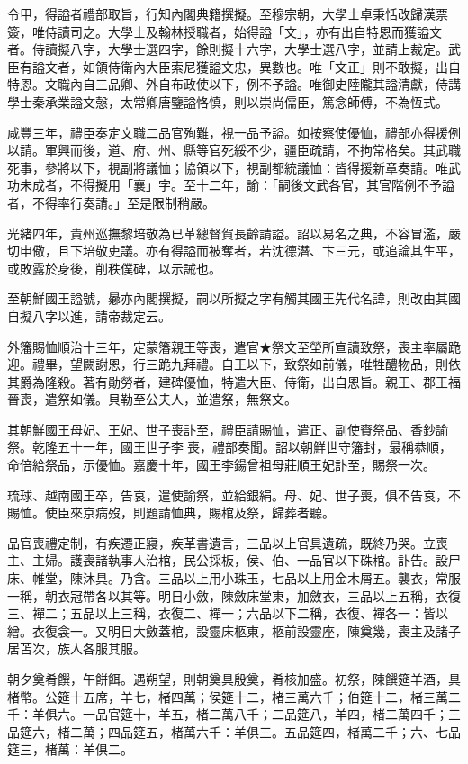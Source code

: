 \begin{pinyinscope}
令甲，得謚者禮部取旨，行知內閣典籍撰擬。至穆宗朝，大學士卓秉恬改歸漢票簽，唯侍讀司之。大學士及翰林授職者，始得謚「文」，亦有出自特恩而獲謚文者。侍讀擬八字，大學士選四字，餘則擬十六字，大學士選八字，並請上裁定。武臣有謚文者，如領侍衛內大臣索尼獲謚文忠，異數也。唯「文正」則不敢擬，出自特恩。文職內自三品卿、外自布政使以下，例不予謚。唯御史陸隴其謚清獻，侍講學士秦承業謚文愨，太常卿唐鑒謚恪慎，則以崇尚儒臣，篤念師傅，不為恆式。

咸豐三年，禮臣奏定文職二品官殉難，視一品予謚。如按察使優恤，禮部亦得援例以請。軍興而後，道、府、州、縣等官死綏不少，疆臣疏請，不拘常格矣。其武職死事，參將以下，視副將議恤；協領以下，視副都統議恤：皆得援新章奏請。唯武功未成者，不得擬用「襄」字。至十二年，諭：「嗣後文武各官，其官階例不予謚者，不得率行奏請。」至是限制稍嚴。

光緒四年，貴州巡撫黎培敬為已革總督賀長齡請謚。詔以易名之典，不容冒濫，嚴切申儆，且下培敬吏議。亦有得謚而被奪者，若沈德潛、卞三元，或追論其生平，或敗露於身後，削秩僕碑，以示誡也。

至朝鮮國王謚號，曏亦內閣撰擬，嗣以所擬之字有觸其國王先代名諱，則改由其國自擬八字以進，請帝裁定云。

外籓賜恤順治十三年，定蒙籓親王等喪，遣官★祭文至塋所宣讀致祭，喪主率屬跪迎。禮畢，望闕謝恩，行三跪九拜禮。自王以下，致祭如前儀，唯牲醴物品，則依其爵為隆殺。著有勛勞者，建碑優恤，特遣大臣、侍衛，出自恩旨。親王、郡王福晉喪，遣祭如儀。貝勒至公夫人，並遣祭，無祭文。

其朝鮮國王母妃、王妃、世子喪訃至，禮臣請賜恤，遣正、副使賚祭品、香鈔諭祭。乾隆五十一年，國王世子李喪，禮部奏聞。詔以朝鮮世守籓封，最稱恭順，命倍給祭品，示優恤。嘉慶十年，國王李鍚曾祖母莊順王妃訃至，賜祭一次。

琉球、越南國王卒，告哀，遣使諭祭，並給銀絹。母、妃、世子喪，俱不告哀，不賜恤。使臣來京病歿，則題請恤典，賜棺及祭，歸葬者聽。

品官喪禮定制，有疾遷正寢，疾革書遺言，三品以上官具遺疏，既終乃哭。立喪主、主婦。護喪諸執事人治棺，民公採板，侯、伯、一品官以下硃棺。訃告。設尸床、帷堂，陳沐具。乃含。三品以上用小珠玉，七品以上用金木屑五。襲衣，常服一稱，朝衣冠帶各以其等。明日小斂，陳斂床堂東，加斂衣，三品以上五稱，衣復三、襌二；五品以上三稱，衣復二、襌一；六品以下二稱，衣復、襌各一：皆以繒。衣復衾一。又明日大斂蓋棺，設靈床柩東，柩前設靈座，陳奠幾，喪主及諸子居苫次，族人各服其服。

朝夕奠肴饌，午餅餌。遇朔望，則朝奠具殷奠，肴核加盛。初祭，陳饌筵羊酒，具楮幣。公筵十五席，羊七，楮四萬；侯筵十二，楮三萬六千；伯筵十二，楮三萬二千：羊俱六。一品官筵十，羊五，楮二萬八千；二品筵八，羊四，楮二萬四千；三品筵六，楮二萬；四品筵五，楮萬六千：羊俱三。五品筵四，楮萬二千；六、七品筵三，楮萬：羊俱二。


\end{pinyinscope}

